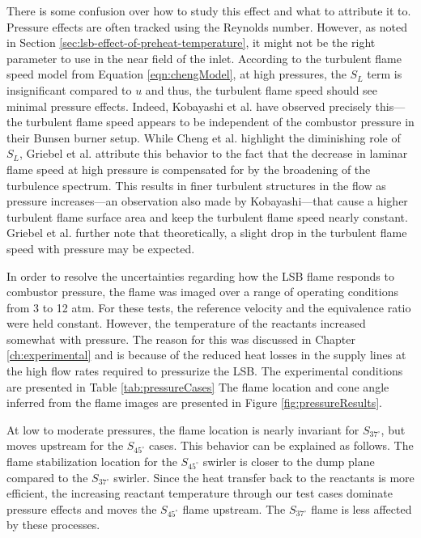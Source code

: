 There is some confusion over how to study this effect and what to attribute it to.
Pressure effects are often tracked using the Reynolds number.
However, as noted in Section \ref{sec:lsb-effect-of-preheat-temperature}, it might not be the right parameter to use in the near field of the inlet.
According to the turbulent flame speed model from Equation \ref{eqn:chengModel}, at high pressures, the \(S_L\) term is insignificant compared to \(u\) and thus, the turbulent flame speed should see minimal pressure effects.
Indeed, Kobayashi et al.\cite{1998-kobayashi,2002-kobayashi-b} have observed precisely this---the turbulent flame speed appears to be independent of the combustor pressure in their Bunsen burner setup.
While Cheng et al. highlight the diminishing role of \(S_L\), Griebel et al.\cite{2007-griebel} attribute this behavior to the fact that the decrease in laminar flame speed at high pressure is compensated for by the broadening of the turbulence spectrum.
This results in finer turbulent structures in the flow as pressure increases---an observation also made by Kobayashi\cite{1997-kobayashi}---that cause a higher turbulent flame surface area and keep the turbulent flame speed nearly constant.
Griebel et al. further note that theoretically, a slight drop in the turbulent flame speed with pressure may be expected.

In order to resolve the uncertainties regarding how the LSB flame responds to combustor pressure, the flame was imaged over a range of operating conditions from 3 to 12 atm.
For these tests, the reference velocity and the equivalence ratio were held constant.
However, the temperature of the reactants increased somewhat with pressure.
The reason for this was discussed in Chapter \ref{ch:experimental} and is because of the reduced heat losses in the supply lines at the high flow rates required to pressurize the LSB.
The experimental conditions are presented in Table \ref{tab:pressureCases}
The flame location and cone angle inferred from the flame images are presented in Figure \ref{fig:pressureResults}.




At low to moderate pressures, the flame location is nearly invariant for \(S_{37^\circ}\), but moves upstream for the \(S_{45^\circ}\) cases.
This behavior can be explained as follows.
The flame stabilization location for the \(S_{45^\circ}\) swirler is closer to the dump plane compared to the \(S_{37^\circ}\) swirler.
Since the heat transfer back to the reactants is more efficient, the increasing reactant temperature through our test cases dominate pressure effects and moves the \(S_{45^\circ}\) flame upstream.
The \(S_{37^\circ}\) flame is less affected by these processes.

